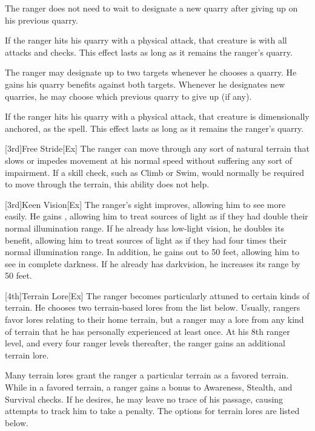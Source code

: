 The ranger does not need to wait to designate a new quarry after giving up on his previous quarry.

If the ranger hits his quarry with a physical attack, that creature is \impaired with all attacks and checks.
This effect lasts as long as it remains the ranger's quarry.

The ranger may designate up to two targets whenever he chooses a quarry.
He gains his quarry benefits against both targets.
Whenever he designates new quarries, he may choose which previous quarry to give up (if any).

If the ranger hits his quarry with a physical attack, that creature is dimensionally anchored, as the  spell.
This effect lasts as long as it remains the ranger's quarry.

[3rd]{Free Stride}[Ex]
The ranger can move through any sort of natural terrain that slows or impedes movement at his normal speed without suffering any sort of impairment.
If a skill check, such as Climb or Swim, would normally be required to move through the terrain, this ability does not help.

[3rd]{Keen Vision}[Ex]
The ranger's sight improves, allowing him to see more easily.
He gains , allowing him to treat sources of light as if they had double their normal illumination range.
If he already has low-light vision, he doubles its benefit, allowing him to treat sources of light as if they had four times their normal illumination range.
In addition, he gains  out to 50 feet, allowing him to see in complete darkness.
If he already has darkvision, he increases its range by 50 feet.

[4th]{Terrain Lore}[Ex]
The ranger becomes particularly attuned to certain kinds of terrain.
He chooses two terrain-based lores from the list below.
Usually, rangers favor lores relating to their home terrain, but a ranger may a lore from any kind of terrain that he has personally experienced at least once.
At his 8th ranger level, and every four ranger levels thereafter, the ranger gains an additional terrain lore.

Many terrain lores grant the ranger a particular terrain as a favored terrain.
While in a favored terrain, a ranger gains a  bonus to Awareness, Stealth, and Survival checks.
If he desires, he may leave no trace of his passage, causing attempts to track him to take a  penalty.
The options for terrain lores are listed below.

